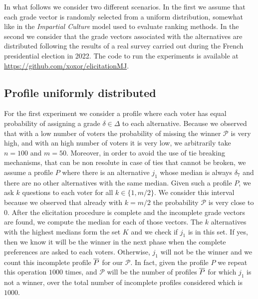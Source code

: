 	In what follows we consider two different scenarios. In the first we assume that each grade vector is randomly selected from a uniform distribution, somewhat like in the \textit{Impartial Culture} model used to evaluate ranking methods. In the second we consider that the grade vectors associated with the alternatives are distributed following the results of a real survey carried out during the French presidential election in 2022. The code to run the experiments is available at \url{	https://github.com/xoxor/elicitationMJ}.

	\subsection{Profile uniformly distributed}
	For the first experiment we consider a profile where each voter has equal probability of assigning a grade $\delta \in \Delta$ to each alternative. Because we observed that with a low number of voters the probability of missing the winner $\mathcal{P}$ is very high, and with an high number of voters it is very low, we arbitrarily take $n=100$ and $m=50$. Moreover, in order to avoid the use of tie breaking mechanisms, that can be non resolute in case of ties that cannot be broken, we assume a profile $P$ where there is an alternative $j_1$ whose median is always $\delta_7$ and there are no other alternatives with the same median. 
	Given such a profile $P$, we ask $k$ questions to each voter for all $k\in \{1,m/2\}$. We consider this interval because we observed that already with $k=m/2$ the probability $\mathcal{P}$ is very close to $0$. After the elicitation procedure is complete and the incomplete grade vectors are found, we compute the median for each of those vectors. The $k$ alternatives with the highest medians form the set $K$ and we check if $j_1$ is in this set. If yes, then we know it will be the winner in the next phase when the complete preferences are asked to each voters. Otherwise, $j_1$ will not be the winner and we count this incomplete profile $\overline{P}$ for our $\mathcal{P}$. In fact, given the profile $P$ we repeat this operation $1000$ times, and $\mathcal{P}$ will be the number of profiles $\overline{P}$ for which $j_1$ is not a winner, over the total number of incomplete profiles considered which is $1000$. 
